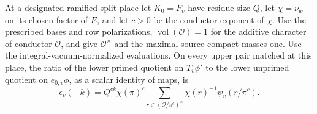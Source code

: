 \begin{proposition}
\label{tpd:ram}
At a designated ramified split place let \(K_0=F_v\) have residue
size \(Q\), let \(\chi=\nu_w\) on its chosen factor of \(E\),
and let \(c>0\) be the conductor exponent of \(\chi\).
Use the prescribed bases and row polarizations, \(\operatorname{vol}
(\mathcal O)=1\) for the additive character of conductor \(\mathcal
O\), and give \(\mathcal O^\times\) and the maximal source compact
masses one. Use the integral-vacuum-normalized evaluations. On
every upper pair matched at this place, the ratio of the lower
primed quotient on \(T_v\phi'\) to the lower unprimed quotient on
\(e_{0,v}\phi\), as a scalar identity of maps, is
\[
   \epsilon_v(-k)=
      Q^{ck}\chi(\pi)^c
       \sum_{r\in(\mathcal O/\pi^c)^\times}
                         \chi(r)^{-1}\psi_v(r/\pi^c).
\]
\end{proposition}

